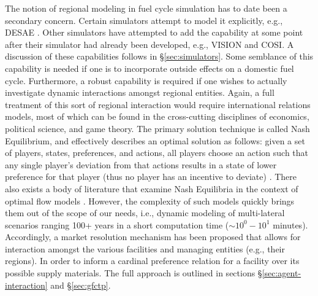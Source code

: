 The notion of regional modeling in fuel cycle simulation has to date been a
secondary concern. Certain simulators attempt to model it explicitly, e.g.,
DESAE \cite{iaea_nuclear_2010}. Other simulators have attempted to add the
capability at some point after their simulator had already been developed, e.g.,
VISION and COSI. A discussion of these capabilities follows in
\S\ref{sec:simulators}. Some semblance of this capability is needed if one is to
incorporate outside effects on a domestic fuel cycle. Furthermore, a robust
capability is required if one wishes to actually investigate dynamic
interactions amongst regional entities. Again, a full treatment of this sort of
regional interaction would require international relations models, most of which
can be found in the cross-cutting disciplines of economics, political science,
and game theory. The primary solution technique is called Nash Equilibrium, and
effectively describes an optimal solution as follows: given a set of players,
states, preferences, and actions, all players choose an action such that any
single player's deviation from that actions results in a state of lower
preference for that player (thus no player has an incentive to deviate)
\cite{mccarty_political_2007}. There also exists a body of literature that
examine Nash Equilibria in the context of optimal flow models
\cite{mazumdar_fairness_1991,nagurney_supply_2002,song_nash_2002}. However, the
complexity of such models quickly brings them out of the scope of our needs,
i.e., dynamic modeling of multi-lateral scenarios ranging 100+ years in a short
computation time ($\sim 10^0 - 10^1$ minutes). Accordingly, a market resolution mechanism
has been proposed that allows for interaction amongst the various facilities and
managing entities (e.g., their regions). In order to inform a cardinal
preference \cite{strotz_cardinal_1953} relation for a facility over its possible
supply materials. The full approach is outlined in sections
\S\ref{sec:agent-interaction} and \S\ref{sec:gfctp}.
